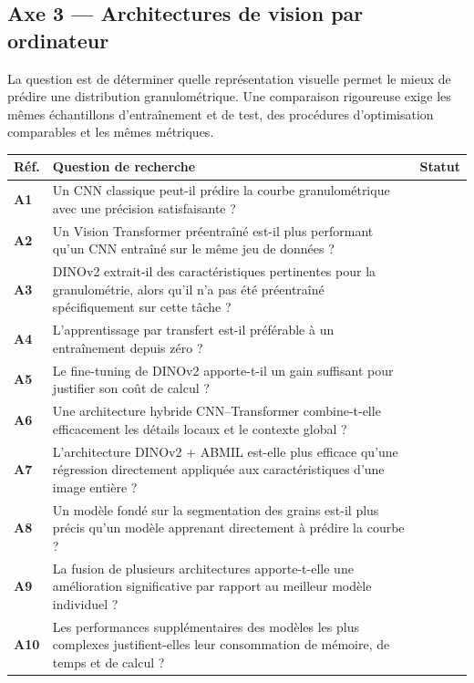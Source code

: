 \documentclass[11pt,a4paper]{article}
\makeatletter
\newenvironment{qtable}{%
  \par\smallskip
  \begin{longtable}{@{}>{\bfseries}p{1.0cm} p{12.3cm} p{1.5cm}@{}}
  \toprule
  \textbf{Réf.} & \textbf{Question de recherche} & \textbf{Statut}\\
  \midrule
  \endhead
}{%
  \bottomrule
  \end{longtable}
}
\makeatother
\begin{document}
\subsection*{Axe 3 --- Architectures de vision par ordinateur}
La question est de déterminer quelle représentation visuelle permet le mieux de prédire une distribution granulométrique. Une comparaison rigoureuse exige les mêmes échantillons d'entraînement et de test, des procédures d'optimisation comparables et les mêmes métriques.
\begin{qtable}
A1 & Un CNN classique peut-il prédire la courbe granulométrique avec une précision satisfaisante ? & \\
A2 & Un Vision Transformer préentraîné est-il plus performant qu'un CNN entraîné sur le même jeu de données ? & \\
A3 & DINOv2 extrait-il des caractéristiques pertinentes pour la granulométrie, alors qu'il n'a pas été préentraîné spécifiquement sur cette tâche ? & \\
A4 & L'apprentissage par transfert est-il préférable à un entraînement depuis zéro ? & \\
A5 & Le fine-tuning de DINOv2 apporte-t-il un gain suffisant pour justifier son coût de calcul ? & \\
A6 & Une architecture hybride CNN--Transformer combine-t-elle efficacement les détails locaux et le contexte global ? & \\
A7 & L'architecture DINOv2 + ABMIL est-elle plus efficace qu'une régression directement appliquée aux caractéristiques d'une image entière ? & \\
A8 & Un modèle fondé sur la segmentation des grains est-il plus précis qu'un modèle apprenant directement à prédire la courbe ? & \\
A9 & La fusion de plusieurs architectures apporte-t-elle une amélioration significative par rapport au meilleur modèle individuel ? & \\
A10 & Les performances supplémentaires des modèles les plus complexes justifient-elles leur consommation de mémoire, de temps et de calcul ? & \\
\end{qtable}
\end{document}
